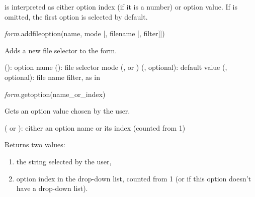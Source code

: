 \documentclass[a4paper,12pt,twoside,extrafontsizes]{memoir}
\begin{document}
\begin{funcremarks}
	 is interpreted as either option index (if it is a number) or option value. If  is omitted, the first option is selected by default.
\end{funcremarks}


\begin{luafuncprototype}
	\emph{form}.addfileoption(name, mode [, filename [, filter]])
\end{luafuncprototype}

\begin{funcdescr}
	Adds a new file selector to the form.
\end{funcdescr}

\begin{funcparams}
	 (): option name
	 (): file selector mode (,  or )
	 (, optional): default value
	 (, optional): file name filter, as in 
\end{funcparams}


\begin{luafuncprototype}
\emph{form}.getoption(name\_or\_index)
\end{luafuncprototype}

\begin{funcdescr}
	Gets an option value chosen by the user.
\end{funcdescr}

\begin{funcparams}
	 ( or ): either an option name or its index (counted from 1)
\end{funcparams}

\begin{funcret}
	Returns two values:
	\begin{enumerate}
		\item the string selected by the user,
		\item option index in the drop-down list, counted from 1 (or  if this option doesn't have a drop-down list).
	\end{enumerate}
\end{funcret}
\end{document}
